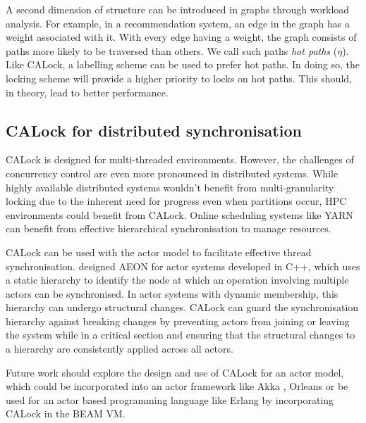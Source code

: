 A second dimension of structure can be introduced in graphs through workload analysis. For example, in a recommendation system, an edge in the graph has a weight associated with it. With every edge having a weight, the graph consists of paths more likely to be traversed than others. We call such paths \emph{hot paths} ($\eta$). Like CALock, a labelling scheme can be used to prefer hot paths. In doing so, the locking scheme will provide a higher priority to locks on hot paths. This should, in theory, lead to better performance. 



\subsection{CALock for distributed synchronisation}

CALock is designed for multi-threaded environments. However, the challenges of concurrency control are even more pronounced in distributed systems. While highly available distributed systems wouldn't benefit from multi-granularity locking due to the inherent need for progress even when partitions occur, HPC environments could benefit from CALock. Online scheduling systems like YARN \cite{DBLP:conf/cloud/VavilapalliMDAKEGLSSSCORRB13} can benefit from effective hierarchical synchronisation to manage resources.

CALock can be used with the actor model to facilitate effective thread synchronisation. \citet{sang_scalable_2020} designed AEON for actor systems developed in C++, which uses a static hierarchy to identify the node at which an operation involving multiple actors can be synchronised. In actor systems with dynamic membership, this hierarchy can undergo structural changes. CALock can guard the synchronisation hierarchy against breaking changes by preventing actors from joining or leaving the system while in a critical section and ensuring that the structural changes to a hierarchy are consistently applied across all actors.

Future work should explore the design and use of CALock for an actor model, which could be incorporated into an actor framework like Akka \cite{10.5555/2663429}, Orleans \cite{10.1145/2038916.2038932} or be used for an actor based programming language like Erlang \cite{armstrong1991erlang} by incorporating CALock in the BEAM VM.




